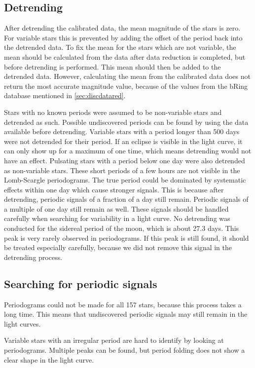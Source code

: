 \documentclass[onecolumn]{aa} %
\begin{document}
\subsection{Detrending}
After detrending the calibrated data, the mean magnitude of the stars is zero. For variable stars this is prevented by adding the offset of the period back into the detrended data. To fix the mean for the stars which are not variable, the mean should be calculated from the data after data reduction is completed, but before detrending is performed. This mean should then be added to the detrended data. However, calculating the mean from the calibrated data does not return the most accurate magnitude value, because of the values from the bRing database mentioned in \ref{sec:discdatared}.

Stars with no known periods were assumed to be non-variable stars and detrended as such. Possible undiscovered periods can be found by using the data available before detrending.
%
Variable stars with a period longer than 500 days were not detrended for their period. If an eclipse is visible in the light curve, it can only show up for a maximum of one time, which means detrending would not have an effect.
%
Pulsating stars with a period below one day were also detrended as non-variable stars. These short periods of a few hours are not visible in the Lomb-Scargle periodograms. The true period could be dominated by systematic effects within one day which cause stronger signals. This is because after detrending, periodic signals of a fraction of a day still remain. Periodic signals of a multiple of one day still remain as well. These signals should be handled carefully when searching for variability in a light curve.
%
No detrending was conducted for the sidereal period of the moon, which is about 27.3 days. This peak is very rarely observed in periodograms. If this peak is still found, it should be treated especially carefully, because we did not remove this signal in the detrending process.

\subsection{Searching for periodic signals}
Periodograms could not be made for all 157 stars, because this process takes a long time. This means that undiscovered periodic signals may still remain in the light curves.

Variable stars with an irregular period are hard to identify by looking at periodograms. Multiple peaks can be found, but period folding does not show a clear shape in the light curve.
\end{document}
